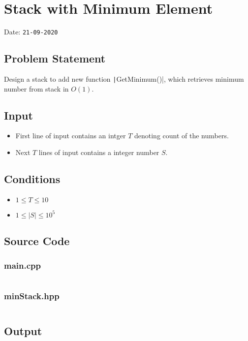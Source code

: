 \section{Stack with Minimum Element}
Date: \texttt{21-09-2020}

\subsection{Problem Statement}
Design a stack to add new function \texttt|GetMinimum()|, which retrieves minimum
number from stack in $O(1)$.

\subsection{Input}
\begin{itemize}
\item First line of input contains an intger $T$ denoting count of the numbers.
\item Next $T$ lines of input contains a integer number $S$.
\end{itemize}

\subsection{Conditions}
\begin{itemize}
\item $1 \leq T \leq 10$
\item $1 \leq |S| \leq 10^{5}$
\end{itemize}

\newpage
\subsection{Source Code}

\subsubsection{main.cpp}
\inputminted[breaklines, linenos]{cpp}{MinStack/main.cpp} 
\subsubsection{minStack.hpp}
\inputminted[breaklines, linenos]{cpp}{MinStack/minStack.h}

\subsection{Output}
\inputminted[breaklines, linenos]{text}{MinStack/analysis.log}
